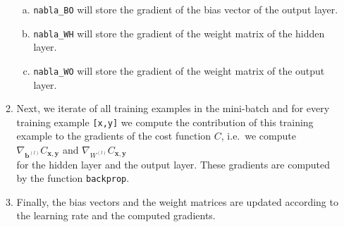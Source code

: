 \begin{enumerate}
\begin{enumerate}
\begin{enumerate}[(a)]
            \item \texttt{nabla\_BO} will store the gradient of the bias vector of the output layer.
            \item \texttt{nabla\_WH} will store the gradient of the weight matrix of the hidden layer.
            \item \texttt{nabla\_WO} will store the gradient of the weight matrix of the output layer.
            \end{enumerate}
      \item Next, we iterate of all training examples in the mini-batch and for every training example
            \texttt{[x,y]} we compute the contribution of this training example to the gradients of the
            cost function $C$, i.e.~we compute
            \\[0.2cm]
            \hspace*{1.3cm}
            $\nabla_{\mathbf{b}^{(l)}} C_{\mathbf{x}, \mathbf{y}}$ \quad and \quad  $\nabla_{W^{(l)}} C_{\mathbf{x},
              \mathbf{y}}$ 
            \\[0.2cm]
            for the hidden layer and the output layer.  These gradients are computed by the function
            \texttt{backprop}.
      \item Finally, the bias vectors and the weight matrices are updated according to the learning rate and the
            computed gradients.
      \end{enumerate}
\end{enumerate}

